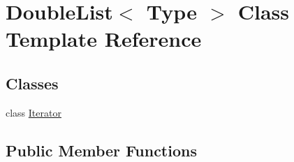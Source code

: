 \hypertarget{classDoubleList}{}\section{Double\+List$<$ Type $>$ Class Template Reference}
\label{classDoubleList}
\subsection*{Classes}
\begin{DoxyCompactItemize}
\item 
class \hyperlink{classDoubleList_1_1Iterator}{Iterator}
\end{DoxyCompactItemize}
\subsection*{Public Member Functions}
